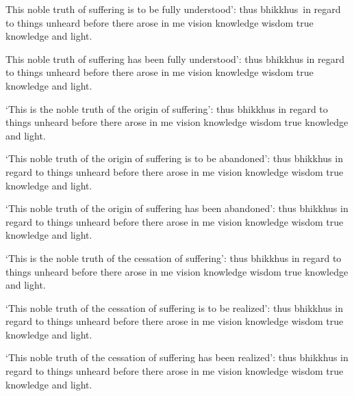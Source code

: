 \begin{english-only-hang}
  This noble truth of suffering is to be fully understood': thus \mbox{bhikkhus}~in regard to things unheard before there arose in me vision knowledge wisdom true knowledge and light.
\end{english-only-hang}

\begin{english-only-hang}
  This noble truth of suffering has been fully understood': thus bhikkhus in regard to things unheard before there arose in me vision knowledge wisdom true knowledge and light.
\end{english-only-hang}

\begin{english-only-hang}
  `This is the noble truth of the origin of suffering': thus bhikkhus in regard to things unheard before there arose in me vision knowledge wisdom true knowledge and light.
\end{english-only-hang}

\begin{english-only-hang}
  `This noble truth of the origin of suffering is to be abandoned': thus bhikkhus in regard to things unheard before there arose in me vision knowledge wisdom true knowledge and light.
\end{english-only-hang}

\begin{english-only-hang}
  `This noble truth of the origin of suffering has been abandoned': thus bhikkhus in regard to things unheard before there arose in me vision knowledge wisdom true knowledge and light.
\end{english-only-hang}

\begin{english-only-hang}
  `This is the noble truth of the cessation of suffering': thus bhikkhus in regard to things unheard before there arose in me vision knowledge wisdom true knowledge and light.
\end{english-only-hang}

\begin{english-only-hang}
  `This noble truth of the cessation of suffering is to be realized': thus bhikkhus in regard to things unheard before there arose in me vision knowledge wisdom true knowledge and light.
\end{english-only-hang}

\begin{english-only-hang}
  `This noble truth of the cessation of suffering has been realized': thus bhikkhus in regard to things unheard before there arose in me vision knowledge wisdom true knowledge and light.
\end{english-only-hang}

